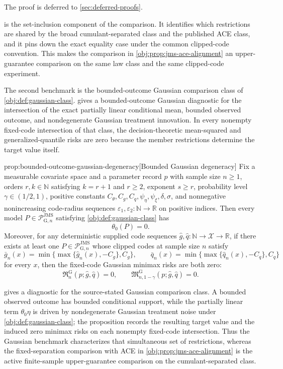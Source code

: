 \documentclass[11pt]{article}
\begin{document}
The proof is deferred to \cref{sec:deferred-proofs}.

 is the set-inclusion component of the comparison. It identifies which restrictions are shared by the broad cumulant-separated class and the published ACE class, and it pins down the exact equality case under the common clipped-code convention. This makes the comparison in \cref{obj:prop:jms-ace-alignment} an upper-guarantee comparison on the same law class and the same clipped-code experiment.

The second benchmark is the bounded-outcome Gaussian comparison class of \cref{obj:def:gaussian-class}.  gives a bounded-outcome Gaussian diagnostic for the intersection of the exact partially linear conditional mean, bounded observed outcome, and nondegenerate Gaussian treatment innovation. In every nonempty fixed-code intersection of that class, the decision-theoretic mean-squared and generalized-quantile risks are zero because the member restrictions determine the target value itself.

\begin{propositionv}{prop:bounded-outcome-gaussian-degeneracy}[Bounded Gaussian degeneracy]
Fix a measurable covariate space and a parameter record \(p\) with sample size \(n\ge1\), orders \(r,k\in\mathbb N\) satisfying \(k=r+1\) and \(r\ge2\), exponent \(s\ge r\), probability level \(\gamma\in(1/2,1)\), positive constants \(C_{\theta},C_g,C_q,\psi_{\eta},\psi_{\xi},\delta,\sigma\), and nonnegative nonincreasing code-radius sequences \(\varepsilon_1,\varepsilon_2:\mathbb N\to\mathbb R\) on positive indices. Then every model \(P\in\mathcal P_{\mathrm G,n}^{\mathrm{JMS}}\) satisfying \cref{obj:def:gaussian-class} has
\[
\theta_0(P)=0.
\]
Moreover, for any deterministic supplied code sequences \(\widehat g,\widehat q:\mathbb N\to\mathcal X\to\mathbb R\), if there exists at least one \(P\in\mathcal P_{\mathrm G,n}^{\mathrm{JMS}}\) whose clipped codes at sample size \(n\) satisfy
\[
\bar g_n(x)=\min\{\max\{\widehat g_n(x),-C_g\},C_g\},
\qquad
\bar q_n(x)=\min\{\max\{\widehat q_n(x),-C_q\},C_q\}
\]
for every \(x\), then the fixed-code Gaussian minimax risks are both zero:
\[
\mathfrak R_n^{\mathrm G}(p;\widehat g,\widehat q)=0,
\qquad
\mathfrak M_{n,1-\gamma}^{\mathrm G}(p;\widehat g,\widehat q)=0.
\]
\end{propositionv}

 gives a diagnostic for the source-stated Gaussian comparison class. A bounded observed outcome has bounded conditional support, while the partially linear term \(\theta_0\eta\) is driven by nondegenerate Gaussian treatment noise under \cref{obj:def:gaussian-class}; the proposition records the resulting target value and the induced zero minimax risks on each nonempty fixed-code intersection. Thus the Gaussian benchmark characterizes that simultaneous set of restrictions, whereas the fixed-separation comparison with ACE in \cref{obj:prop:jms-ace-alignment} is the active finite-sample upper-guarantee comparison on the cumulant-separated class.
\end{document}
